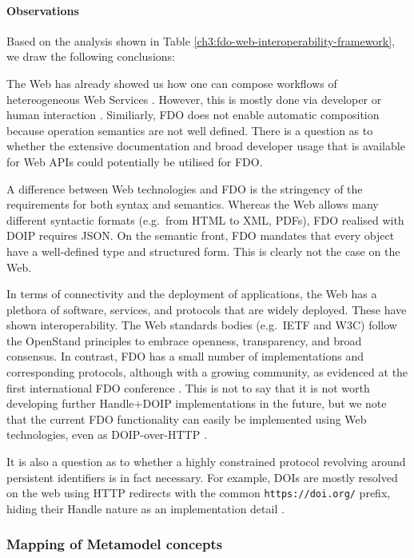 \paragraph{Observations}

Based on the analysis shown in Table \ref{ch3:fdo-web-interoperability-framework}, we draw the following conclusions:

The Web has already showed us how one can compose workflows of hetereogeneous Web Services \cite{Wolstencroft 2013}. However, this is mostly done via developer or human interaction \cite{Lamprecht 2021}. Similiarly, FDO does not enable automatic composition because operation semantics are not well defined. There is a question as to whether the extensive documentation and broad developer usage that is available for Web APIs could potentially be utilised for FDO.

A difference between Web technologies and FDO is the stringency of the requirements for both syntax and semantics. Whereas the Web allows many different syntactic formats (e.g.~from HTML to XML, PDFs), FDO realised with DOIP requires JSON. On the semantic front, FDO mandates that every object have a well-defined type and structured form. This is clearly not the case on the Web.

In terms of connectivity and the deployment of applications, the Web has a plethora of software, services, and protocols that are widely deployed. These have shown interoperability. The Web standards bodies (e.g.~IETF and W3C) follow the OpenStand principles \cite{OpenStand 2017} to embrace openness, transparency, and broad consensus. In contrast, FDO has a small number of implementations and corresponding protocols, although with a growing community, as evidenced at the first international FDO conference \cite{Loo 2022}. This is not to say that it is not worth developing further \gls{Handle}+\acrshort{DOIP} implementations in the future, but we note that the current FDO functionality can easily be implemented using Web technologies, even as DOIP-over-HTTP \cite{CNRI 2023a}.

It is also a question as to whether a highly constrained protocol revolving around persistent identifiers is in fact necessary. For example, DOIs are mostly resolved on the web using HTTP redirects with the common \texttt{https://doi.org/} prefix, hiding their Handle nature as an implementation detail \cite{DOI 2019}.


\subsubsection{Mapping of Metamodel concepts}\label{ch3:mapping-of-metamodel-concepts}

